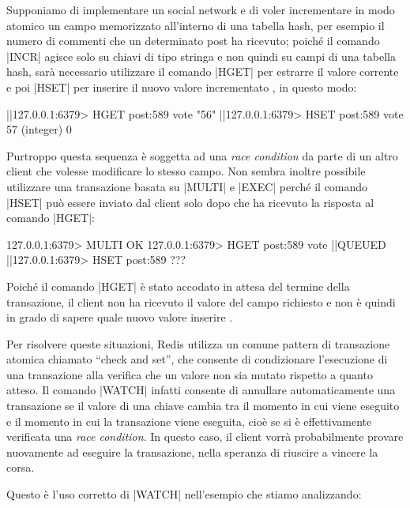 Supponiamo di implementare un social network e di voler incrementare in modo atomico un campo
memorizzato all'interno di una tabella hash, per esempio il numero di commenti che un determinato
post ha ricevuto; poiché il comando \cverb|INCR| agisce solo su chiavi di tipo stringa e non quindi
su campi di una tabella hash, sarà necessario utilizzare il comando \cverb|HGET| per estrarre il
valore corrente  e poi \cverb|HSET| per inserire il nuovo valore incrementato , in
questo modo:

\begin{commentedsource}[style=redis]
|\lnote|127.0.0.1:6379> HGET post:589 vote
"56"
|\lnote|127.0.0.1:6379> HSET post:589 vote 57
(integer) 0
\end{commentedsource}

Purtroppo questa sequenza è soggetta ad una \emph{race condition} da parte di un altro client che
volesse modificare lo stesso campo. Non sembra inoltre possibile utilizzare una transazione basata
su \cverb|MULTI| e \cverb|EXEC| perché il comando \cverb|HSET| può essere inviato dal client solo dopo
che ha ricevuto la risposta al comando \cverb|HGET|:

\begin{commentedsource}[style=redis]
127.0.0.1:6379> MULTI
OK
127.0.0.1:6379> HGET post:589 vote
|\lnote|QUEUED
|\lnote|127.0.0.1:6379> HSET post:589 ???
\end{commentedsource}

Poiché il comando \cverb|HGET| è stato accodato in attesa del termine della transazione, il client
non ha ricevuto il valore del campo richiesto  e non è quindi in grado di sapere quale
nuovo valore inserire .

Per risolvere queste situazioni, Redis utilizza un comune pattern di transazione atomica chiamato
``check and set'', che consente di condizionare l'esecuzione di una transazione alla verifica che un
valore non sia mutato rispetto a quanto atteso. Il comando \cverb|WATCH| infatti consente di
annullare automaticamente una transazione se il valore di una chiave cambia tra il momento in cui
viene eseguito e il momento in cui la transazione viene eseguita, cioè se si è effettivamente
verificata una \emph{race condition}. In questo caso, il client vorrà probabilmente provare
nuovamente ad eseguire la transazione, nella speranza di riuscire a vincere la corsa.

Questo è l'uso corretto di \cverb|WATCH| nell'esempio che stiamo a\-na\-liz\-zan\-do:

